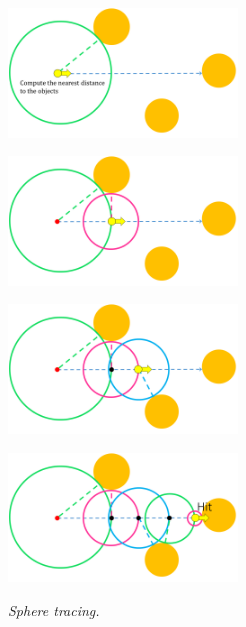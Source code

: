 \begin{figure}[htbp]
 \begin{minipage}[t]{0.5\hsize}
  \center
  \includegraphics[height=1.35in, keepaspectratio]{img/visualization/sphereTracing1.png}
  \subcaption{\textit{}}
  \label{fig:st1}
  \hspace*{\fill}
 \end{minipage}
 \begin{minipage}[t]{0.5\hsize}
  \center
  \includegraphics[height=1.35in, keepaspectratio]{img/visualization/sphereTracing2.png}
  \subcaption{\textit{}}
  \label{fig:st2}
  \hspace*{\fill}
 \end{minipage}
 \begin{minipage}[t]{0.5\hsize}
  \center
  \includegraphics[height=1.35in, keepaspectratio]{img/visualization/sphereTracing3.png}
  \subcaption{\textit{}}
  \label{fig:st3}
  \hspace*{\fill}
 \end{minipage}
 \begin{minipage}[t]{0.5\hsize}
  \center
  \includegraphics[height=1.35in, keepaspectratio]{img/visualization/sphereTracing4.png}
  \subcaption{\textit{}}
  \label{fig:st4}
  \hspace*{\fill}
 \end{minipage}
 \caption{\textit{Sphere tracing.}}
 \label{fig:sphereTracing}
\end{figure}

